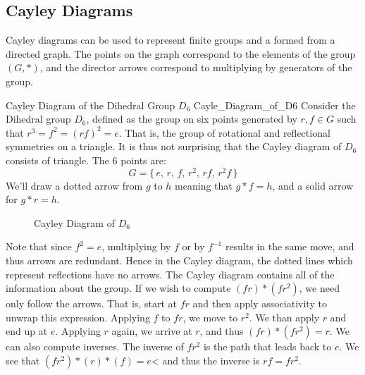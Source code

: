     \subsection{Cayley Diagrams}
        Cayley diagrams can be used to represent finite groups and a formed from
        a directed graph. The points on the graph correspond to the elements of
        the group $(G,*)$, and the director arrows correspond to multiplying by
        generators of the group.
        \begin{lexample}{Cayley Diagram of the Dihedral Group $D_{6}$}
                        {Cayle_Diagram_of_D6}
            Consider the Dihedral group $D_{6}$, defined as the group on six
            points generated by $r,f\in{G}$ such that $r^{3}=f^{2}=(rf)^{2}=e$.
            That is, the group of rotational and reflectional symmetries on a
            triangle. It is thus not surprising that the Cayley diagram of
            $D_{6}$ consists of triangle. The 6 points are:
            \begin{equation}
                G=\{\,e,\,r,\,f,\,r^{2},\,rf,\,r^{2}f\,\}
            \end{equation}
            We'll draw a dotted arrow from $g$ to $h$ meaning that $g*f=h$, and
            a solid arrow for $g*r=h$.
            \begin{figure}[H]
                \centering
                \captionsetup{type=figure}
                
                \caption{Cayley Diagram of $D_{6}$}
                \label{fig:Cayley_Diagram_D6}
            \end{figure}
            Note that since $f^{2}=e$, multiplying by $f$ or by $f^{\minus{1}}$
            results in the same move, and thus arrows are redundant. Hence in
            the Cayley diagram, the dotted lines which represent reflections
            have no arrows. The Cayley diagram contains all of the information
            about the group. If we wish to compute $(fr)*(fr^{2})$, we need only
            follow the arrows. That is, start at $fr$ and then apply
            associativity to unwrap this expression. Applying $f$ to $fr$, we
            move to $r^{2}$. We than apply $r$ and end up at $e$. Applying $r$
            again, we arrive at $r$, and thus $(fr)*(fr^{2})=r$. We can also
            compute inverses. The inverse of $fr^{2}$ is the path that leads
            back to $e$. We see that $(fr^{2})*(r)*(f)=e$< and thus the inverse
            is $rf=fr^{2}$.
        \end{lexample}
